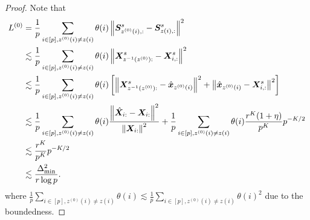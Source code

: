 \documentclass[lettersize,onecolumn,journal]{IEEEtran}
\theoremstyle{definition}
\theoremstyle{definition}
\newcommand{\off}[1]{\left[#1\right]}
\begin{document}
\begin{proof}
Note that 
\begin{align}
    L^{(0)} &= \frac{1}{p} \sum_{i \in [p], z^{(0)}(i) \neq z(i)} \theta(i) \onorm{\mS_{z^{(0)}(i),:}^s - \mS_{z(i),:}^s}^2 \\
    & \lesssim \frac{1}{p} \sum_{i \in [p], z^{(0)}(i) \neq z(i)} \theta(i) \onorm{\mX^s_{z^{-1}(z^{(0)}):} - \mX^s_{i,:}}^2\\
    & \lesssim \frac{1}{p} \sum_{i \in [p], z^{(0)}(i) \neq z(i)} \theta(i) \off{ \onorm{ \mX^s_{z^{-1}(z^{(0)}):} - \hat \mx_{z^{(0)}(i)} }^2 + \onorm{ \hat \mx_{z^{(0)}(i)} - \mX^s_{i,:}}^2 }\\
    & \lesssim   \frac{1}{p} \sum_{i \in [p], z^{(0)}(i) \neq z(i)} \theta(i) \frac{ \onorm{\hat \mX_{i:} - \mX_{i:}}^2 }{ \onorm{ \mX_{i:}}^2 } +  \frac{1}{p} \sum_{i \in [p], z^{(0)}(i) \neq z(i)} \theta(i)  \frac{r^K(1 + \eta)}{p^{K}} p^{-K/2} \\
    & \lesssim \frac{r^K}{p^{K}} p^{-K/2} \\
    & \lesssim \frac{\Delta_{\min}^2}{r \log p}.
\end{align}
where $\frac{1}{p} \sum_{i \in [p], z^{(0)}(i) \neq z(i)} \theta(i) \lesssim \frac{1}{p} \sum_{i \in [p], z^{(0)}(i) \neq z(i)} \theta(i)^2$ due to the boundedness.
\end{proof}
\end{document}
